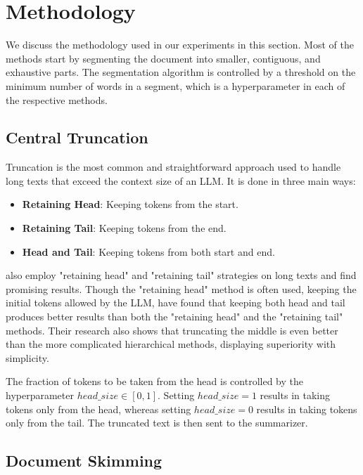 \section{Methodology}
\label{sec:methodology}

We discuss the methodology used in our experiments in this section.
Most of the methods start by segmenting the document into smaller, contiguous, and
exhaustive parts.
The segmentation algorithm is controlled by a threshold on the minimum number of words
in a segment, which is a hyperparameter in each of the respective methods.


\subsection{Central Truncation}
\label{method:truncation}

Truncation is the most common and straightforward approach used to handle long texts
that exceed the context size of an LLM.
It is done in three main ways:

\begin{itemize}
	\item \textbf{Retaining Head}: Keeping tokens from the start.
	\item \textbf{Retaining Tail}: Keeping tokens from the end.
	\item \textbf{Head and Tail}: Keeping tokens from both start and end.
\end{itemize}

\citet{worsham-kalita-2018-genre} also employ "retaining head" and "retaining tail"
strategies on long texts and find promising results.
Though the "retaining head" method is often used, keeping the initial tokens allowed
by the LLM, \citet{sun2019fine} have found that keeping both head and tail produces
better results than both the "retaining head" and the "retaining tail" methods.
Their research also shows that truncating the middle is even better than the more
complicated hierarchical methods, displaying superiority with simplicity.

The fraction of tokens to be taken from the head is controlled by the hyperparameter
$head\_size \in [0, 1]$.
Setting $head\_size = 1$ results in taking tokens only from the head, whereas
setting $head\_size = 0$ results in taking tokens only from the tail.
The truncated text is then sent to the summarizer.


\subsection{Document Skimming}
\label{method:skimming}

